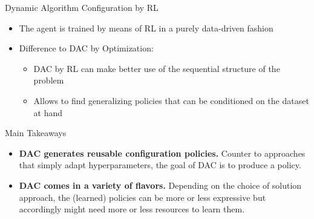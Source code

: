 \documentclass[main]{subfiles}
\begin{document}
\begin{frame}{Dynamic Algorithm Configuration by RL}
\begin{tikzpicture}[node distance=4cm]
    \end{tikzpicture}
    \begin{itemize}
        \item The agent is trained by means of RL in a purely data-driven fashion\pause
        \item Difference to DAC by Optimization:\pause
        \begin{itemize}
            \item DAC by RL can make better use of the sequential structure of the problem
            \item Allows to find generalizing policies that can be conditioned on the dataset at hand
        \end{itemize}
    \end{itemize}
\end{frame}
\begin{frame}{Main Takeaways} 


\begin{itemize}
    \item \textbf{DAC generates reusable configuration policies.} Counter to approaches that simply adapt hyperparameters, the goal of DAC is to produce a policy.
    \item \textbf{DAC comes in a variety of flavors.} Depending on the choice of solution approach, the (learned) policies can be more or less expressive but accordingly might need more or less resources to learn them.
\end{itemize}

\end{frame}
\end{document}
